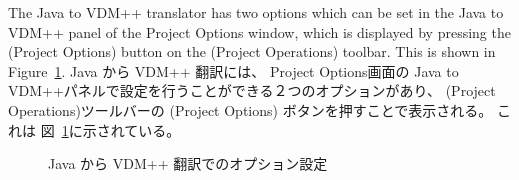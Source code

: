 \documentclass[\pformat,12pt]{jarticle}
\newcommand{\guicmd}[1]{{\sf #1}}
\begin{document}
The Java to VDM++ translator has two options which can be set in the 
\guicmd{Java to VDM++} panel of the \guicmd{Project Options} window, 
which is displayed by pressing the
(\guicmd{Project Options}) button on the (\guicmd{Project Operations})
toolbar. This is shown in Figure~\ref{fig:j2voptions}.
Java から VDM++ 翻訳には、 \guicmd{Project Options}画面の \guicmd{Java to VDM++}パネルで設定を行うことができる２つのオプションがあり、 (\guicmd{Project Operations})ツールバーの (\guicmd{Project Options}) ボタンを押すことで表示される。
これは 図~\ref{fig:j2voptions}に示されている。

\begin{figure}[tbh]
\begin{center}
\caption{Java から VDM++ 翻訳でのオプション設定\label{fig:j2voptions}}
\end{center}
\end{figure}
\end{document}
